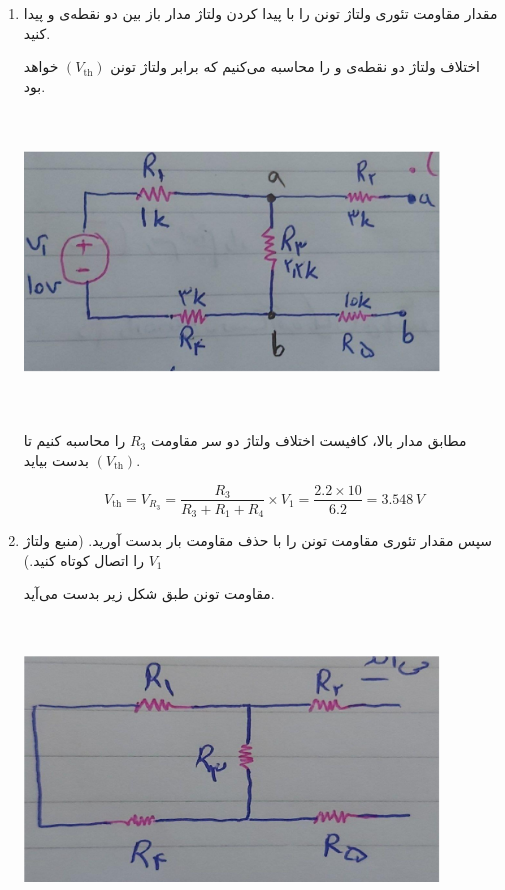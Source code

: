 \documentclass{article}
\begin{document}
		\begin{enumerate}[label=\Alph*), align=left, leftmargin=*]
			\item 
			مقدار مقاومت تئوری ولتاژ‌ تونن را با پیدا کردن ولتاژ مدار باز بین دو نقطه‌ی  و  پیدا کنید.
			
			اختلاف ولتاژ دو نقطه‌ی 
			و
			را محاسبه می‌کنیم که برابر ولتاژ تونن 
			$\left(V_{\text{th}}\right)$
			خواهد بود.
			\begin{center}
				\includegraphics[width=11cm, height=8cm]{./images/R3.1.2}
			\end{center}
		
			مطابق مدار بالا، کافیست اختلاف ولتاژ دو سر مقاومت 
			$R_3$
			را محاسبه کنیم تا 
			$\left(V_{\text{th}}\right)$
			بدست بیاید.
			
			\begin{equation*}
				V_{\text{th}} = V_{R_{3}} = \frac{R_3}{R_3 + R_1 + R_4} \times V_1 = \frac{2.2 \times 10}{6.2} = 3.548 \, V
			\end{equation*}
			\item 
			سپس مقدار تئوری مقاومت تونن را با حذف مقاومت بار بدست آورید. (منبع ولتاژ $V_1$ را اتصال کوتاه کنید.)
			
			مقاومت تونن طبق شکل زیر بدست می‌آید.
			\begin{center}
				\includegraphics[width=11cm, height=8cm]{./images/R3.1.3}
			\end{center}
		

\end{enumerate}
\end{document}
